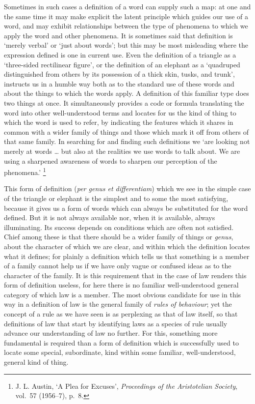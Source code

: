 Sometimes in such cases a definition of a word can supply such a map: at
one and the same time it may make explicit the latent principle which
guides our use of a word, and may exhibit relationships between the type
of phenomena to which we apply the word and other phenomena. It is
sometimes said that definition is `merely verbal' or `just about words';
but this may be most misleading where the expression defined is one in
current use. Even the definition of a triangle as a `three-sided
rectilinear figure', or the definition of an elephant as a `quadruped
distinguished from others by its possession of a thick skin, tusks, and
trunk', instructs us in a humble way both as to the standard use of
these words and about the things to which the words apply. A definition
of this familiar type does two things at once. It simultaneously
provides a code or formula translating the word into other
well-understood terms and locates for us the kind of thing to which the
word is used to refer, by indicating the features which it shares in
common with a wider family of things and those which mark it off from
others of that same family. In searching for and finding such
definitions we `are looking not merely at words \ldots{} but also at the
realities we use words to talk about. We are using a sharpened awareness
of words to sharpen our perception of the phenomena.' \footnote{J. L.
  Austin, `A Plea for Excuses', \emph{Proceedings of the Aristotelian
  Society}, vol.~57 (1956--7), p.~8.}

This form of definition (\emph{per genus et differentiam}) which we see
in the simple case of the triangle or elephant is the simplest and to
some the most satisfying, because it gives us a form of words which can
always be substituted for the word defined. But it is not always
available nor, when it is available, always illuminating. Its success
depends on conditions which are often not satisfied. Chief among these
is that there should be a wider family of things or \emph{genus}, about
the character of which we are clear, and within which the definition
locates what it defines; for plainly a definition which tells us that
something is a member of a family cannot help us if we have only vague
or confused ideas as to the character of the family. It is this
requirement that in the case of law renders this form of definition
useless, for here there is no familiar well-understood general category
of which law is a member. The most obvious candidate for use in this way
in a definition of law is the general family of \emph{rules of
behaviour}; yet the concept of a rule as we have seen is as perplexing
as that of law itself, so that definitions of law that start by
identifying laws as a species of rule usually advance our understanding
of law no further. For this, something more fundamental is required than
a form of definition which is successfully used to locate some special,
subordinate, kind within some familiar, well-understood, general kind of
thing.

